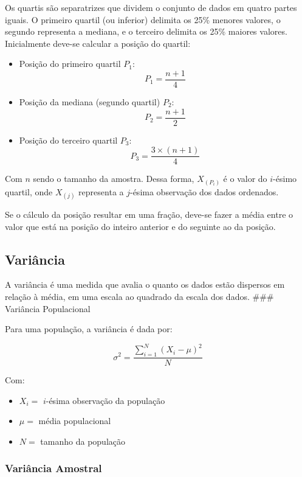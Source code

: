\documentclass[
]{estat/estat}
\begin{document}
Os quartis são separatrizes que dividem o conjunto de dados em quatro
partes iguais. O primeiro quartil (ou inferior) delimita os 25\% menores
valores, o segundo representa a mediana, e o terceiro delimita os 25\%
maiores valores. Inicialmente deve-se calcular a posição do quartil:

\begin{itemize}
\item
  Posição do primeiro quartil \(P_1\): \[P_1=\frac{n+1}{4}\]
\item
  Posição da mediana (segundo quartil) \(P_2\): \[P_2 = \frac{n+1}{2}\]
\item
  Posição do terceiro quartil \(P_3\): \[P_3=\frac{3 \times (n+1)}{4}\]
\end{itemize}

Com \(n\) sendo o tamanho da amostra. Dessa forma,
\(X_{\left( P_i \right)}\) é o valor do \(i\)-ésimo quartil, onde
\(X_{\left( j \right)}\) representa a \(j\)-ésima observação dos dados
ordenados.

Se o cálculo da posição resultar em uma fração, deve-se fazer a média
entre o valor que está na posição do inteiro anterior e do seguinte ao
da posição.

\subsection{Variância}\label{variuxe2ncia}

A variância é uma medida que avalia o quanto os dados estão dispersos em
relação à média, em uma escala ao quadrado da escala dos dados. \#\#\#
Variância Populacional

Para uma população, a variância é dada por:

\[\sigma^2=\frac{\sum\limits_{i=1}^{N}\left(X_i - \mu\right)^2}{N}\]

Com:

\begin{itemize}
\item
  \(X_i =\) \(i\)-ésima observação da população
\item
  \(\mu =\) média populacional
\item
  \(N =\) tamanho da população
\end{itemize}

\subsubsection{Variância Amostral}\label{variuxe2ncia-amostral}
\end{document}
